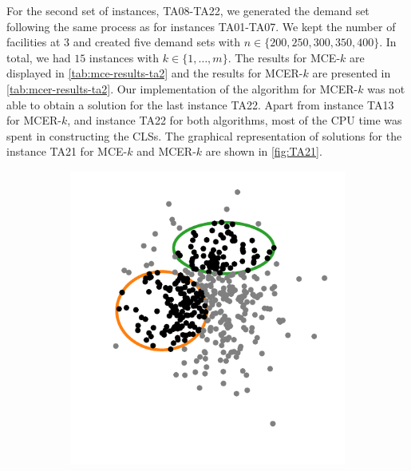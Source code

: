 For the second set of instances, TA08-TA22, we generated the demand set following the same process as for instances TA01-TA07.
We kept the number of facilities at $3$ and created five demand sets with $n\in\{200, 250, 300, 350, 400\}$. In total, we had $15$ instances with $k\in\{1, \dots, m\}$. The results for MCE-$k$ are displayed in \autoref{tab:mce-results-ta2} and the results for MCER-$k$ are presented in \autoref{tab:mcer-results-ta2}.
Our implementation of the algorithm for MCER-$k$ was not able to obtain a solution for the last instance TA22. Apart from instance TA13 for MCER-$k$, and instance TA22 for both algorithms, most of the CPU time was spent in constructing the CLSs.
The graphical representation of solutions for the instance TA21 for MCE-$k$ and MCER-$k$ are shown in \autoref{fig:TA21}.

\begin{figure}
	\begin{subfigure}{.5\textwidth}
		\centering
		\includegraphics[scale=.9]{tex/figures/MCE_TA21}
		\caption{}
		\label{fig:MCE_TA21}
	\end{subfigure}
	\begin{subfigure}{.5\textwidth}
		\centering

\end{subfigure}
\end{figure}
